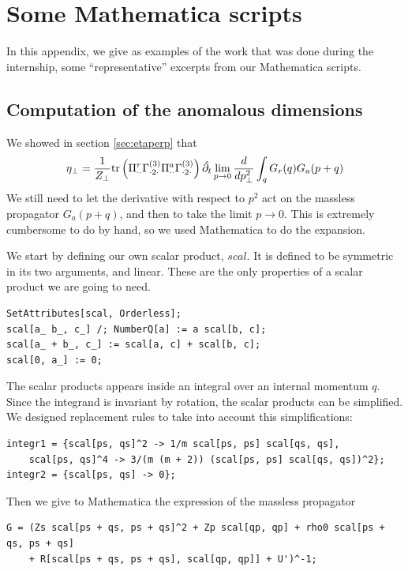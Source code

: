 \chapter{Some Mathematica scripts}
\label{app:mathematica}

In this appendix, we give as examples of the work that was done during the internship, some ``representative'' excerpts from our Mathematica scripts.

\section{Computation of the anomalous dimensions}

We showed in section \eqref{sec:etaperp} that 
\begin{align}
\eta_\perp = \frac{1}{Z_\perp}  \text{tr}\left(\Pi^r_{\cdot \cdot} \Gamma^{(3)}_{\cdot2\cdot} \Pi^a_{\cdot \cdot} \Gamma^{(3)}_{\cdot2\cdot}\right)  \hat{\partial_{t}} \lim_{p \rightarrow 0} \frac{d}{dp^2_\perp} \int_q G_r(q) G_a(p+q)
\end{align}
We still need to let the derivative with respect to $p^2$ act on the massless propagator $G_a(p+q)$, and then to take the limit $p \rightarrow 0$. This is extremely cumbersome to do by hand, so we used Mathematica to do the expansion.

We start by defining our own scalar product, $scal$. It is defined to be symmetric in its two arguments, and linear. These are the only properties of a scalar product we are going to need.
\begin{lstlisting}
SetAttributes[scal, Orderless];
scal[a_ b_, c_] /; NumberQ[a] := a scal[b, c];
scal[a_ + b_, c_] := scal[a, c] + scal[b, c];
scal[0, a_] := 0;
\end{lstlisting}

The scalar products appears inside an integral over an internal momentum $q$. Since the integrand is invariant by rotation, the scalar products can be simplified. We designed replacement rules to take into account this simplifications:
\begin{lstlisting}
integr1 = {scal[ps, qs]^2 -> 1/m scal[ps, ps] scal[qs, qs],  
	scal[ps, qs]^4 -> 3/(m (m + 2)) (scal[ps, ps] scal[qs, qs])^2};
integr2 = {scal[ps, qs] -> 0};
\end{lstlisting}

Then we give to Mathematica the expression of the massless propagator
\begin{lstlisting}
G = (Zs scal[ps + qs, ps + qs]^2 + Zp scal[qp, qp] + rho0 scal[ps + qs, ps + qs] 
	+ R[scal[ps + qs, ps + qs], scal[qp, qp]] + U')^-1;
\end{lstlisting}

